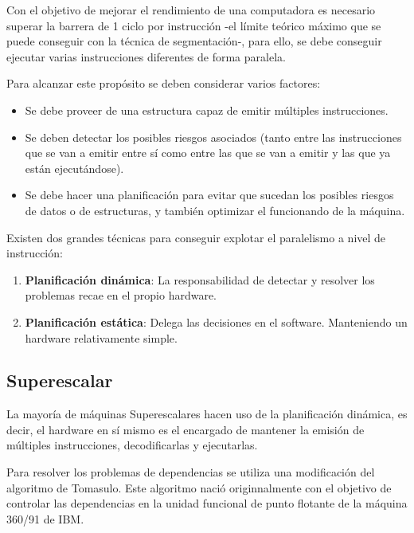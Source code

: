 Con el objetivo de mejorar el rendimiento de una computadora es necesario superar la barrera
de 1 ciclo por instrucción -el límite teórico máximo que se puede conseguir con la técnica de segmentación-,
para ello, se debe conseguir ejecutar varias instrucciones diferentes de forma paralela.\cite{Hennessy:2011}

\bigskip
Para alcanzar este propósito se deben considerar varios factores:

\begin{itemize}

\item Se debe proveer de una estructura capaz de emitir múltiples instrucciones.

\item Se deben detectar los posibles riesgos asociados (tanto entre las instrucciones que se van a 
emitir entre sí como entre las que se van a emitir y las que ya están ejecutándose). 

\item Se debe hacer una planificación para evitar que sucedan los posibles riesgos de datos o 
de estructuras, y también optimizar el funcionando de la máquina.

\end{itemize}

\bigskip
Existen dos grandes técnicas para conseguir explotar el paralelismo a nivel de instrucción:

\begin{enumerate}

\item \textbf{Planificación dinámica}: La responsabilidad de detectar y resolver los problemas recae
en el propio hardware.

\item \textbf{Planificación estática}: Delega las decisiones en el software. Manteniendo un hardware
relativamente simple.

\end{enumerate}

\subsection{Superescalar}

La mayoría de máquinas Superescalares hacen uso de la planificación dinámica, es decir, el hardware 
en sí mismo es el encargado de mantener la emisión de múltiples instrucciones, decodificarlas y 
ejecutarlas.

\bigskip
Para resolver los problemas de dependencias se utiliza una modificación del algoritmo de Tomasulo.
Este algoritmo nació originnalmente con el objetivo de controlar las dependencias en la unidad
funcional de punto flotante de la máquina 360/91 de IBM.


